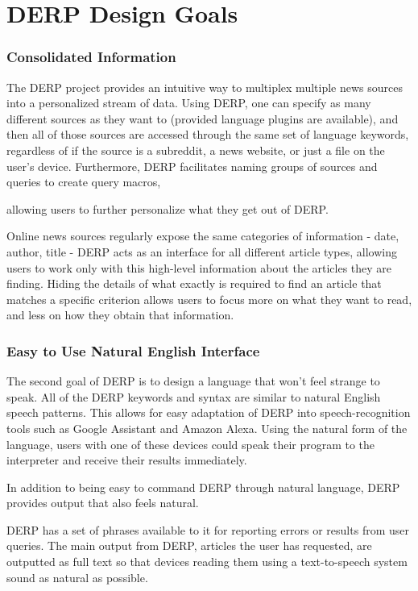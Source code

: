 \documentclass{article}
\begin{document}
\section{DERP Design Goals}
\subsubsection{Consolidated Information}
The DERP project provides an intuitive way to multiplex multiple news sources into a personalized stream of data. Using DERP, one can specify as many different sources as they want to (provided language plugins are available), and then all of those sources are accessed through the same set of language keywords, regardless of if the source is a subreddit, a news website, or just a file on the user's device. Furthermore, DERP facilitates naming groups of sources and queries to create query macros,
\begin{comment}
@ADS Did we actually decide on if we want savable sets of instructions other than in the form of a DERP program? (Can a program create another program?)
\end{comment}
allowing users to further personalize what they get out of DERP.

Online news sources regularly expose the same categories of information - date, author, title - DERP acts as an interface for all different article types, allowing users to work only with this high-level information about the articles they are finding. Hiding the details of what exactly is required to find an article that matches a specific criterion allows users to focus more on what they want to read, and less on how they obtain that information.

\subsubsection{Easy to Use Natural English Interface}
The second goal of DERP is to design a language that won't feel strange to speak. All of the DERP keywords and syntax are similar to natural English speech patterns. This allows for easy adaptation of DERP into speech-recognition tools such as Google Assistant and Amazon Alexa. Using the natural form of the language, users with one of these devices could speak their program to the interpreter and receive their results immediately.

In addition to being easy to command DERP through natural language, DERP provides output that also feels natural.
\begin{comment}
@ADS - Is this something we're actually doing? We've kind of had it implied
in discussions, but never explicitly talked about it
\end{comment}
DERP has a set of phrases available to it for reporting errors or results from user queries. The main output from DERP, articles the user has requested, are outputted as full text so that devices reading them using a text-to-speech system sound as natural as possible.
\end{document}
